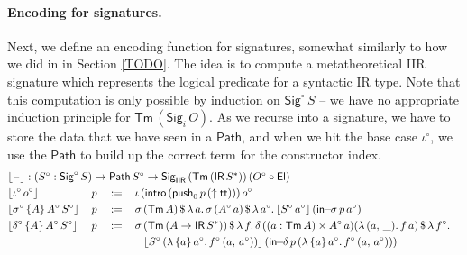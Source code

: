 \documentclass[acmsmall,screen,review,anonymous]{acmart}
\newcommand{\msf}[1]{{\mathsf{#1}}}
\newcommand{\push}{\mathsf{push}}
\newcommand{\Set}{\msf{Set}}
\newcommand{\El}{\msf{El}}
\newcommand{\lup}{\uparrow}
\newcommand{\Sig}{\msf{Sig}}
\newcommand{\ttt}{\msf{tt}}
\newcommand{\blank}{{\mathord{\hspace{1pt}\text{--}\hspace{1pt}}}}
\newcommand{\IR}{\msf{IR}}
\newcommand{\intro}{\msf{intro}}
\newcommand{\IIR}{\msf{IIR}}
\newcommand{\floord}[1]{\lfloor #1 \rfloor}
\newcommand{\Tm}{\msf{Tm}}
\newcommand{\w}{\circ}
\newcommand{\Path}{\msf{Path}}
\newcommand{\insigma}{\msf{in}\!\!-\!\!\sigma}
\newcommand{\indelta}{\msf{in}\!\!-\!\!\delta}
\begin{document}
\paragraph{Encoding for signatures.} Next, we define an encoding function for signatures, somewhat
similarly to how we did in in Section \ref{TODO}. The idea is to compute a metatheoretical IIR
signature which represents the logical predicate for a syntactic IR type.  Note that this
computation is only possible by induction on $\Sig^\w\,S$ \--- we have no appropriate
induction principle for $\Tm\,(\Sig_i\,O)$.
As we
recurse into a signature, we have to store the data that we have seen in a $\Path$,
and when we hit the base case $\iota^\w$, we use the $\Path$ to build up the correct
term for the constructor index.
\begin{alignat*}{5}
  &\rlap{$\floord{\blank} : (S^\w : \Sig^\w\,S) \to \Path\,S^\w \to \Sig_\IIR\,(\Tm\,(\IR\,S^*))\,(O^\w\circ \El)$}\\
  &\floord{\iota^\w\,o^\w}\,&&p               &&:=\,&&\iota\,(\intro\,(\push_0\,p\,(\lup\ttt)))\,o^\w\\
  &\floord{\sigma^\w\,\{A\}\,A^\w\,S^\w}\,&&p &&:=\,&&\sigma\,(\Tm\,A)\,\$\,\lambda\,a.\,\sigma\,(A^\w\,a)\,\$\,\lambda\,a^\w.\,\floord{S^\w\,a^\w}\,(\insigma\,p\,a^\w)\\
  &\floord{\delta^\w\,\{A\}\,A^\w\,S^\w}\,&&p &&:=\,&&\sigma\,(\Tm\,(A \to \IR\,S^*))\,\$\,\lambda\,f.\,\delta\,((a : \Tm\,A) \times A^\w\,a) (\lambda\,(a,\,\_).\,f\,a)\,\$\,\lambda\,f^\w.\\
  &                       &&              &&   &&\hspace{0.8em}\floord{S^\w\,(\lambda\,\{a\}\,a^\w.\,f^\w\,(a,\,a^\w))}\,(\indelta\,p\,(\lambda\,\{a\}\,a^\w.\,f^\w\,(a,\,a^\w)))
\end{alignat*}
\end{document}
